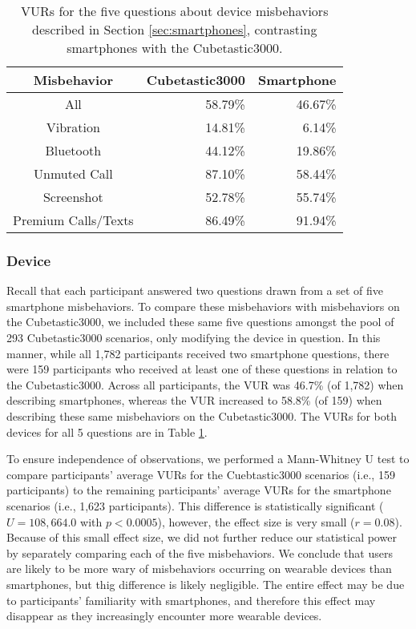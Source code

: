 

\begin{table}[t]
\small
\begin{center}
\begin{tabular}{| c | r | r |}
\hline
 Misbehavior &  Cubetastic3000 & Smartphone \\
 \hline
 \hline
 All & 58.79\% & 46.67\%\\
 \hline
Vibration & 14.81\%  &  6.14\%\\
Bluetooth & 44.12\%  &  19.86\%\\
Unmuted Call & 87.10\%  &  58.44\%\\
Screenshot & 52.78\%  & 55.74\%\\
Premium Calls/Texts & 86.49\%  &  91.94\%\\ 
\hline
\end{tabular}
\caption{VURs for the five questions about device misbehaviors described in Section \ref{sec:smartphones}, contrasting smartphones with the Cubetastic3000.}
\label{deviceVUR}
\end{center}
\end{table}

\subsubsection{Device}
Recall that each participant answered two questions drawn from a set of five smartphone misbehaviors. To compare these misbehaviors with misbehaviors on the Cubetastic3000, we included these same five questions amongst the pool of 293 Cubetastic3000 scenarios, only modifying the device in question. In this manner, while all 1,782 participants received two smartphone questions, there were 159 participants who received at least one of these questions in relation to the Cubetastic3000. Across all participants, the VUR was 46.7\% (of 1,782) when describing smartphones, whereas the VUR increased to 58.8\% (of 159) when describing these same misbehaviors on the Cubetastic3000. The VURs for both devices for all 5 questions are in Table \ref{deviceVUR}.

To ensure independence of observations, we performed a Mann-Whitney U test to compare participants' average VURs for the Cuebtastic3000 scenarios (i.e., 159 participants) to the remaining participants' average VURs for the smartphone scenarios (i.e., 1,623 participants). This difference is statistically significant ($U=108,664.0$ with $p<0.0005$), however, the effect size is very small ($r=0.08$). Because of this small effect size, we did not further reduce our statistical power by separately comparing each of the five misbehaviors. We conclude that users are likely to be more wary of misbehaviors occurring on wearable devices than smartphones, but thig difference is likely negligible. The entire effect may be due to participants' familiarity with smartphones, and therefore this effect may disappear as they increasingly encounter more wearable devices.

